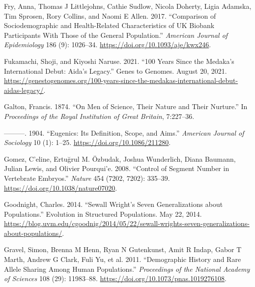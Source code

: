 \documentclass[
]{book}
\newlength{\cslhangindent}
\newlength{\cslentryspacingunit} %
\newenvironment{CSLReferences}[2] %
 {%
  \setlength{\parindent}{0pt}
  \ifodd #1
  \let\oldpar\par
  \def\par{\hangindent=\cslhangindent\oldpar}
  \fi
  \setlength{\parskip}{#2\cslentryspacingunit}
 }%
 {}
\begin{document}
\begin{CSLReferences}{1}{0}
\leavevmode{}%
Fry, Anna, Thomas J Littlejohns, Cathie Sudlow, Nicola Doherty, Ligia Adamska, Tim Sprosen, Rory Collins, and Naomi E Allen. 2017. {``Comparison of {Sociodemographic} and {Health-Related Characteristics} of {UK Biobank Participants With Those} of the {General Population}.''} \emph{American Journal of Epidemiology} 186 (9): 1026--34. \url{https://doi.org/10.1093/aje/kwx246}.

\leavevmode{}%
Fukamachi, Shoji, and Kiyoshi Naruse. 2021. {``100 Years Since the Medaka's International Debut: {Aida}'s Legacy.''} {Genes to Genomes}. August 20, 2021. \url{https://genestogenomes.org/100-years-since-the-medakas-international-debut-aidas-legacy/}.

\leavevmode{}%
Galton, Francis. 1874. {``On {Men} of {Science}, Their {Nature} and Their {Nurture}.''} In \emph{Proceedings of the {Royal Institution} of {Great Britain}}, 7:227--36.

\leavevmode{}%
---------. 1904. {``Eugenics: {Its Definition}, {Scope}, and {Aims}.''} \emph{American Journal of Sociology} 10 (1): 1--25. \url{https://doi.org/10.1086/211280}.

\leavevmode{}%
Gomez, C'eline, Ertuğrul M. Özbudak, Joshua Wunderlich, Diana Baumann, Julian Lewis, and Olivier Pourqui'e. 2008. {``Control of Segment Number in Vertebrate Embryos.''} \emph{Nature} 454 (7202, 7202): 335--39. \url{https://doi.org/10.1038/nature07020}.

\leavevmode{}%
Goodnight, Charles. 2014. {``Sewall {Wright}'s {Seven Generalizations} about {Populations}.''} {Evolution in Structured Populations}. May 22, 2014. \url{https://blog.uvm.edu/cgoodnig/2014/05/22/sewall-wrights-seven-generalizations-about-populations/}.

\leavevmode{}%
Gravel, Simon, Brenna M Henn, Ryan N Gutenkunst, Amit R Indap, Gabor T Marth, Andrew G Clark, Fuli Yu, et al. 2011. {``Demographic History and Rare Allele Sharing Among Human Populations.''} \emph{Proceedings of the National Academy of Sciences} 108 (29): 11983--88. \url{https://doi.org/10.1073/pnas.1019276108}.


\end{CSLReferences}
\end{document}
